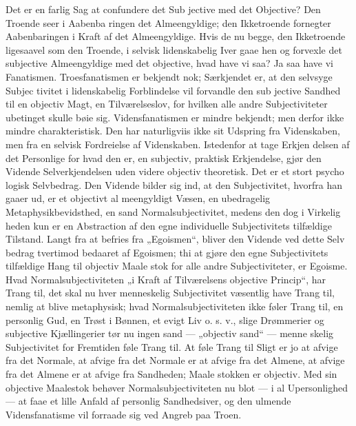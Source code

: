 \documentclass[12pt]{book}
\newcommand{\opage}[1]{\marginnote{\footnotesize\textit{[#1]}}}
\begin{document}
Det er en farlig Sag at confundere det Sub\-%
jective med det Objective? Den Troende seer i Aabenba\-%
ringen det Almeengyldige; den Ikketroende fornegter
Aabenbaringen i Kraft af det Almeengyldige. Hvis de
nu begge, den Ikketroende ligesaavel som den Troende,
i selvisk lidenskabelig Iver gaae hen og forvexle det
subjective Almeengyldige med det objective, hvad have
vi saa? Ja saa have vi Fanatismen. Troesfanatismen er
bekjendt nok; Særkjendet er, at den selvsyge Subjec\-%
tivitet i lidenskabelig Forblindelse vil forvandle den sub\-%
jective Sandhed til en objectiv Magt, en Tilværelseslov,
for hvilken alle andre Subjectiviteter ubetinget skulle
\opage{19}\setcounter{footnote}{0}%
bøie sig. Vidensfanatismen er mindre bekjendt; men
derfor ikke mindre charakteristisk. Den har naturligviis
ikke sit Udspring fra Videnskaben, men fra en selvisk
Fordreielse af Videnskaben. Istedenfor at tage Erkjen\-%
delsen af det Personlige for hvad den er, en subjectiv,
praktisk Erkjendelse, gjør den Vidende Selverkjendelsen
uden videre objectiv theoretisk. Det er et stort psycho\-%
logisk Selvbedrag. Den Vidende bilder sig ind, at den
Subjectivitet, hvorfra han gaaer ud, er et objectivt al\-%
meengyldigt Væsen, en ubedragelig Metaphysikbevidsthed,
en sand Normalsubjectivitet, medens den dog i Virkelig\-%
heden kun er en Abstraction af den egne individuelle
Subjectivitets tilfældige Tilstand. Langt fra at befries
fra „Egoismen“, bliver den Vidende ved dette Selv\-%
bedrag tvertimod bedaaret af Egoismen; thi at gjøre den
egne Subjectivitets tilfældige Hang til objectiv Maale\-%
stok for alle andre Subjectiviteter, er Egoisme. Hvad
Normalsubjectiviteten „i Kraft af Tilværelsens objective
Princip“, har Trang til, det skal nu hver menneskelig
Subjectivitet væsentlig have Trang til, nemlig at blive
metaphysisk; hvad Normalsubjectiviteten ikke føler Trang
til, en personlig Gud, en Trøst i Bønnen, et evigt Liv
o. s. v., slige Drømmerier og subjective Kjællingerier
tør nu ingen sand --- „objectiv sand“ --- menne\-%
skelig Subjectivitet for Fremtiden føle Trang til. At
føle Trang til Sligt er jo at afvige fra det Normale, at
afvige fra det Normale er at afvige fra det Almene, at
afvige fra det Almene er at afvige fra Sandheden; Maale\-%
stokken er objectiv. Med sin objective Maalestok behøver
Normalsubjectiviteten nu blot --- i al Upersonlighed ---
at faae et lille Anfald af personlig Sandhedsiver, og den
ulmende Vidensfanatisme vil forraade sig ved Angreb
paa Troen.
\end{document}
